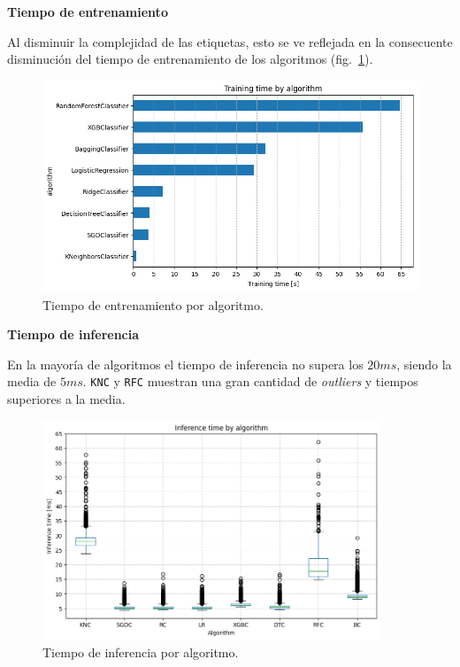 \documentclass[a4paper,12pt]{article}
\begin{document}
		\textbf{Tiempo de entrenamiento}
		
		Al disminuir la complejidad de las etiquetas, esto se ve reflejada en la consecuente disminución del tiempo de entrenamiento de los algoritmos (fig.~\ref{fig:training_time_uet}).
		
		\begin{figure}[H]
			\begin{center}
				\includegraphics[width=1\textwidth]{training_time_uet.png}
				\caption{Tiempo de entrenamiento por algoritmo.}
				\label{fig:training_time_uet}
			\end{center}
		\end{figure}
		
		\textbf{Tiempo de inferencia}
		
		En la mayoría de algoritmos el tiempo de inferencia no supera los $20ms$, siendo la media de $5ms$. \texttt{KNC} y \texttt{RFC} muestran una gran cantidad de \textit{outliers} y tiempos superiores a la media.
		
		\begin{figure}[H]
			\begin{center}
				\includegraphics[width=0.9\textwidth]{inference_time_uet.png}
				\caption{Tiempo de inferencia por algoritmo.}
				\label{fig:inference_time_uet}
			\end{center}
		\end{figure}
		
\end{document}

